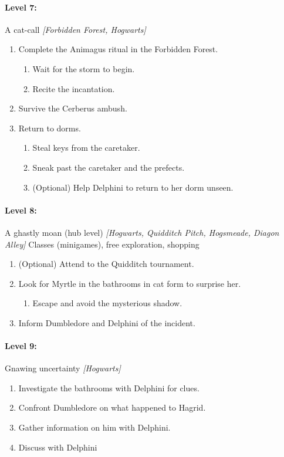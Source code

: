 \paragraph{Level 7:} A cat-call \textit{[Forbidden Forest, Hogwarts]}
\begin{enumerate}[1)]
	\item Complete the Animagus ritual in the Forbidden Forest.
	\begin{enumerate}[1.]
		\item Wait for the storm to begin.
		\item Recite the incantation.
	\end{enumerate}
	\item Survive the Cerberus ambush.
	\item Return to dorms.
	\begin{enumerate}[1.]
		\item Steal keys from the caretaker.
		\item Sneak past the caretaker and the prefects.
		\item (Optional) Help Delphini to return to her dorm unseen.
	\end{enumerate}
\end{enumerate}

\paragraph{Level 8:} A ghastly moan (hub level) \textit{[Hogwarts, Quidditch Pitch, Hogsmeade, Diagon Alley]}
Classes (minigames), free exploration, shopping

\begin{enumerate}[1)]
	\item (Optional) Attend to the Quidditch tournament.
	\item Look for Myrtle in the bathrooms in cat form to surprise her.
	\begin{enumerate}[1.]
		\item Escape and avoid the mysterious shadow.
	\end{enumerate}
	\item Inform Dumbledore and Delphini of the incident.
\end{enumerate}

\paragraph{Level 9:} Gnawing uncertainty \textit{[Hogwarts]}
\begin{enumerate}[1)]
	\item Investigate the bathrooms with Delphini for clues.
	\item Confront Dumbledore on what happened to Hagrid.
	\item Gather information on him with Delphini.
	\item Discuss with Delphini
\end{enumerate}

